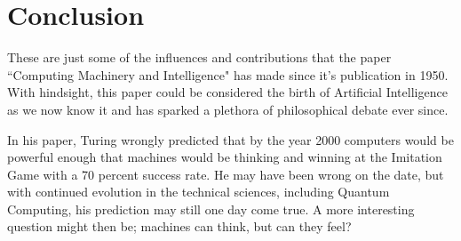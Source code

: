\documentclass{scrartcl}
\begin{document}
\section{Conclusion}
These are just some of the influences and contributions that the paper \textquotedblleft Computing Machinery and Intelligence" has made since it's publication in 1950. With hindsight, this paper could be considered the birth of Artificial Intelligence as we now know it and has sparked a plethora of philosophical debate ever since. \par
In his paper, Turing wrongly predicted that by the year 2000 computers would be powerful enough that machines would be thinking and winning at the Imitation Game with a 70 percent success rate. He may have been wrong on the date, but with continued evolution in the technical sciences, including Quantum Computing, his prediction may still one day come true. A more interesting question might then be; machines can think, but can they feel?









\end{document}
